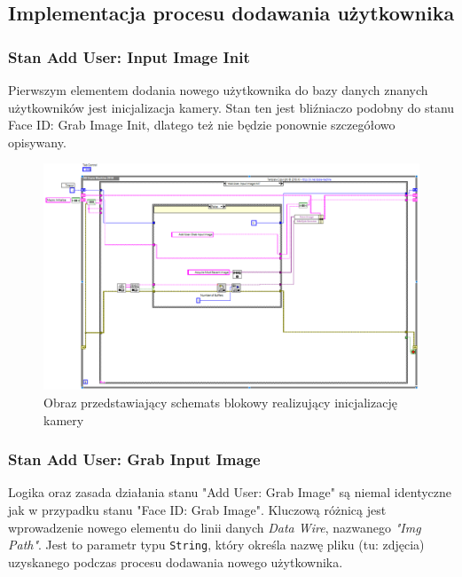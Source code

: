 \documentclass{report}
\begin{document}

\subsection{\Large Implementacja procesu dodawania użytkownika}

\subsubsection{\large Stan Add User: Input Image Init}

Pierwszym elementem dodania nowego użytkownika do bazy danych znanych użytkowników jest inicjalizacja kamery. Stan ten jest bliźniaczo podobny do stanu Face ID: Grab Image Init, dlatego też nie będzie ponownie szczegółowo opisywany. 

\begin{figure}[H]
    \centering
    \includegraphics*[width=1.0\textwidth]{src/add-user/add-init.png}
    \caption{Obraz przedstawiający schemats blokowy realizujący inicjalizację kamery}
    \label{fig:add-user-init}
\end{figure}

\subsubsection{\large Stan Add User: Grab Input Image}

Logika oraz zasada działania stanu "Add User: Grab Image" są niemal identyczne jak w przypadku stanu "Face ID: Grab Image". Kluczową różnicą jest wprowadzenie nowego elementu do linii danych \textit{Data Wire}, nazwanego \textit{"Img Path"}. Jest to parametr typu \texttt{String}, który określa nazwę pliku (tu: zdjęcia) uzyskanego podczas procesu dodawania nowego użytkownika.
\end{document}
